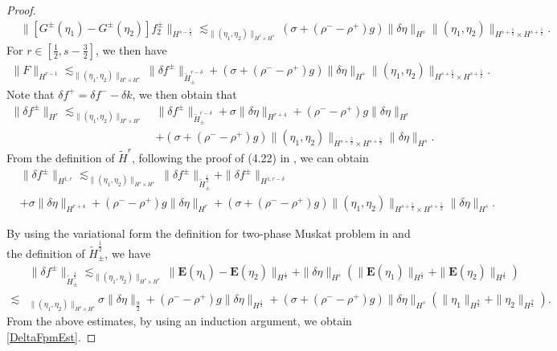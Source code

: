 \documentclass[12pt]{amsart}
\theoremstyle{definition}
\numberwithin{equation}{section}
\newcommand{\f}{\frac}
\begin{document}
\begin{proof}
\begin{align*}
 &\|[G^{\pm}(\eta_1) - G^{\pm}(\eta_2)]f_2^{\pm}\|_{H^{s-\f52}} \lesssim_{\|(\eta_1, \eta_2)\|_{H^s \times H^s}} (\sigma + (\rho^- -\rho^+)g)\|\delta \eta\|_{H^s} \|(\eta_1, \eta_2)\|_{H^{s+\f52}\times H^{s+\f52}}.
\end{align*}
For $r\in[\f12,s-\f32]$, we then have
\begin{align*}
\|F\|_{H^{r-1}}
\lesssim_{\|(\eta_1,\eta_2)\|_{H^s\times H^s}}\|\delta f^{\pm}\|_{\tilde{H}^{r-\delta}_{\pm}}
+(\sigma + (\rho^- -\rho^+)g)\|\delta \eta\|_{H^s} \|(\eta_1, \eta_2)\|_{H^{s+\f52}\times H^{s+\f52}}.
\end{align*}
Note that $\delta f^+=\delta f^--\delta k$, we then obtain that
\begin{align*}
\|\delta f^{\pm}\|_{H^r}  \lesssim_{\|(\eta_1, \eta_2)\|_{H^{s}\times H^{s}}}& \|\delta f^{\pm}\|_{\tilde{H}^{r-\delta}_{\pm}}+\sigma \|\delta \eta \|_{H^{r+4}}+ (\rho^- -\rho^+)g \|\delta \eta\|_{H^r}\\
&+ (\sigma + (\rho^- -\rho^+)g)\| (\eta_1,\eta_2) \|_{H^{s+\f52}\times H^{s+\f52}}\| \delta \eta\|_{H^s} .
\end{align*}
From the definition of $\tilde{H}^{r}$, following the proof of (4.22) in \cite{MR4131404}, we can obtain
\begin{align*}
&\|\delta f^{\pm}\|_{H^{1,r}}\lesssim_{\|(\eta_1,\eta_2)\|_{H^s\times H^s}}\|\delta f^{\pm}\|_{\tilde{H}^{\f12}_{\pm}}+\|\delta f^{\pm}\|_{H^{1,r-\delta}}\\
&+\sigma \|\delta \eta \|_{H^{r+4}}+ (\rho^- -\rho^+)g \|\delta \eta\|_{H^r}+ (\sigma + (\rho^- -\rho^+)g)\| (\eta_1,\eta_2) \|_{H^{s+\f52}\times H^{s+\f52}}\| \delta \eta\|_{H^s}.
\end{align*}

By using the variational form the definition for two-phase Muskat problem in \cite{MR4090462} and the definition of $\tilde{H}^{\f12}_{\pm}$, we have
\begin{align*}
&\|\delta f^{\pm}\|_{\tilde{H}^{\f12}_{\pm}}  \lesssim_{\|(\eta_1, \eta_2)\|_{H^{s}\times H^{s}}} \|\mathbf{E}(\eta_1)-\mathbf{E}(\eta_2)\|_{H^{\f12}}+ \|\delta\eta\|_{H^s}(\|\mathbf{E}(\eta_1)\|_{H^{\f12}}+\|\mathbf{E}(\eta_2)\|_{H^{\f12}})\\
\lesssim&_{\|(\eta_1, \eta_2)\|_{H^{s}\times H^{s}}}\sigma\|\delta\eta\|_{\f92}+(\rho^--\rho^+)g\|\delta\eta\|_{H^{\f12}}+(\sigma+(\rho^--\rho^+)g)\|\delta\eta\|_{H^s}\left(\|\eta_1\|_{H^{\f92}}+\|\eta_2\|_{H^{\f92}}\right).
\end{align*}
From the above estimates, by using an induction argument, we  obtain \eqref{DeltaFpmEst}.
\end{proof}
\end{document}
